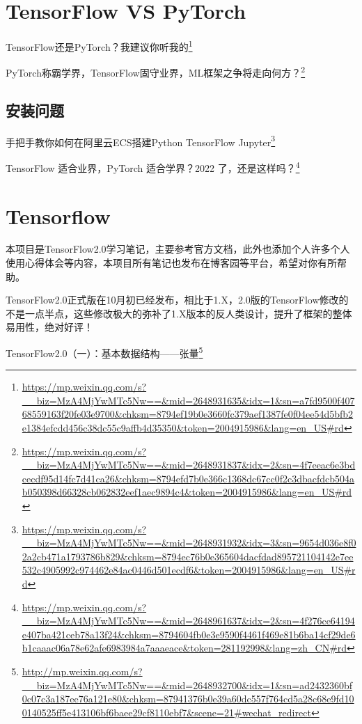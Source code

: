 \documentclass[]{ctexbook}
\renewcommand{\href}[2]{#2\footnote{\url{#1}}}
\begin{document}
\hypertarget{tensorflow-vs-pytorch}{%
\section{TensorFlow VS PyTorch}\label{tensorflow-vs-pytorch}}

\href{https://mp.weixin.qq.com/s?__biz=MzA4MjYwMTc5Nw==\&mid=2648931635\&idx=1\&sn=a7fd9500f40768559163f20fe03e9700\&chksm=8794ef19b0e3660fc379aef1387fe0f04ee54d5bfb2e1384efcdd456c38dc55c9affb4d35350\&token=2004915986\&lang=en_US\#rd}{TensorFlow还是PyTorch？我建议你听我的}

\href{https://mp.weixin.qq.com/s?__biz=MzA4MjYwMTc5Nw==\&mid=2648931837\&idx=2\&sn=4f7eeac6e3bdcecdf95d14fc7d41ca26\&chksm=8794efd7b0e366c1368dc67cc0f2c3dbacfdcb504ab050398d66328cb062832eef1aec9894c4\&token=2004915986\&lang=en_US\#rd}{PyTorch称霸学界，TensorFlow固守业界，ML框架之争将走向何方？}

\hypertarget{ux5b89ux88c5ux95eeux9898}{%
\subsection{安装问题}\label{ux5b89ux88c5ux95eeux9898}}

\href{https://mp.weixin.qq.com/s?__biz=MzA4MjYwMTc5Nw==\&mid=2648931932\&idx=3\&sn=9654d036e8f02a2cb471a1793786b829\&chksm=8794ec76b0e365604dacfdad895721104142e7ee532c4905992c974462e84ac0446d501ecdf6\&token=2004915986\&lang=en_US\#rd}{手把手教你如何在阿里云ECS搭建Python TensorFlow Jupyter}

\href{https://mp.weixin.qq.com/s?__biz=MzA4MjYwMTc5Nw==\&mid=2648961637\&idx=2\&sn=4f276ce64194e407ba421ceb78a13f24\&chksm=8794604fb0e3e9590f4461f469e81b6ba14cf29de6b1caaac06a78e62afe6983984a7aaaeace\&token=281192998\&lang=zh_CN\#rd}{TensorFlow 适合业界，PyTorch 适合学界？2022 了，还是这样吗？}

\hypertarget{tensorflow}{%
\section{Tensorflow}\label{tensorflow}}

本项目是TensorFlow2.0学习笔记，主要参考官方文档，此外也添加个人许多个人使用心得体会等内容，本项目所有笔记也发布在博客园等平台，希望对你有所帮助。

TensorFlow2.0正式版在10月初已经发布，相比于1.X，2.0版的TensorFlow修改的不是一点半点，这些修改极大的弥补了1.X版本的反人类设计，提升了框架的整体易用性，绝对好评！

\href{http://mp.weixin.qq.com/s?__biz=MzA4MjYwMTc5Nw==\&mid=2648932700\&idx=1\&sn=ad2432360bf0c07c3a187ee76a121e80\&chksm=87941376b0e39a60dc557f764cd5a28c68e9fd100140525ff5e413106bf6baee29cf8110ebf7\&scene=21\#wechat_redirect}{TensorFlow2.0（一）：基本数据结构------张量}
\end{document}
